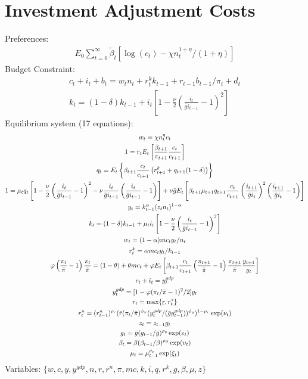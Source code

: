 \documentclass[12pt, final]{article}
\newcommand{\ubar}[1]{\underaccent{\bar}{#1}}
\begin{document}
\section{Investment Adjustment Costs}

Preferences:
\begin{gather*}
 E_0\sum_{t=0}^\infty\tilde{\beta}_t[\log(c_t)-\chi n_t^{1+\eta}/(1+\eta)] 
\end{gather*}
Budget Constraint:
\begin{gather*}
  c_t+i_t+b_t=w_tn_t+r_t^kk_{t-1}+r_{t-1}b_{t-1}/\pi_t+d_t\\
  k_t=(1-\delta)k_{t-1}+i_t\left[1-\frac{\nu}{2}\left(\frac{i_t}{\bar{g}i_{t-1}}-1\right)^2\right]
\end{gather*}
Equilibrium system (17 equations):
\scriptsize\begin{gather}
  w_t=\chi n_t^\eta c_t\\
  1= r_tE_t\left[\frac{\beta_{t+1}}{\pi_{t+1}}\frac{c_t}{c_{t+1}}\right]\\
  q_t = E_t\left\{\beta_{t+1}\frac{c_t}{c_{t+1}}\left(r_{t+1}^k+q_{t+1}(1-\delta)\right)\right\}\\
  1 = \mu_tq_t\left[1-\frac{\nu}{2}\left(\frac{i_t}{\bar{g}i_{t-1}}-1\right)^2-\nu\frac{i_t}{\bar{g}i_{t-1}}\left(\frac{i_t}{\bar{g}i_{t-1}}-1\right)\right]+\nu\bar{g}
  E_t\left[\beta_{t+1}\mu_{t+1}q_{t+1}\frac{c_t}{c_{t+1}}\left(\frac{i_{t+1}}{\bar{g}i_t}\right)^2\left(\frac{i_{t+1}}{\bar{g}i_t}-1\right)\right]\\
  y_t=k_{t-1}^\alpha(z_tn_t)^{1-\alpha}\\
  k_t=(1-\delta)k_{t-1}+\mu_ti_t\left[1-\frac{\nu}{2}\left(\frac{i_{t}}{\bar{g}i_{t-1}}-1\right)^2\right]\\
  w_t = (1-\alpha)mc_ty_t/n_t\\
  r_t^k = \alpha mc_ty_t/k_{t-1}\\
  \varphi\left(\frac{\pi_t}{\bar{\pi}}-1\right)\frac{\pi_t}{\bar{\pi}} = (1-\theta) + \theta mc_t + \varphi E_t\left[\beta_{t+1}\frac{c_t}{c_{t+1}}\left(\frac{\pi_{t+1}}{\bar{\pi}}-1\right)\frac{\pi_{t+1}}{\bar{\pi}}\frac{y_{t+1}}{y_t}\right]\\
  c_t+i_t=y_t^{gdp}\\
  y_t^{gdp} = [1-\varphi(\pi_t/\bar{\pi}-1)^2/2]y_t\\
  r_t=\max\{\ubar{r},r_t^*\}\\
   r_t^n=(r_{t-1}^n)^{\rho_r}(\bar{r}(\pi_t/\bar{\pi})^{\phi_\pi}(y_t^{gdp}/(\bar{g}y_{t-1}^{gdp}))^{\phi_y})^{1-\rho_r}\exp(\nu_t)\\
  z_t=z_{t-1}g_t\\
  g_t=\bar{g}(g_{t-1}/\bar{g})^{\rho_g}\exp(\varepsilon_t)\\
  \beta_t=\beta(\beta_{t-1}/\beta)^{\rho_\beta}\exp(\upsilon_t)\\
  \mu_t=\mu_{t-1}^{\rho_\mu}\exp(\xi_t)
\end{gather}\normalsize
Variables: $\{w,c,y,y^{gdp},n,r,r^n,\pi,mc,k,i,q,r^k,g,\beta,\mu,z\}$\\
\end{document}
